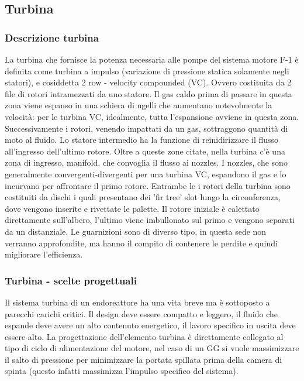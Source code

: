 \subsection{Turbina}
\subsubsection{Descrizione turbina}

La turbina che fornisce la potenza necessaria alle pompe del sistema motore F-1 è definita come turbina a impulso (variazione di pressione statica solamente negli statori), e cosiddetta 2 row - velocity compounded (VC). Ovvero costituita da 2 file di rotori intramezzati da uno statore. Il gas caldo prima di passare in questa zona viene espanso in una schiera di ugelli che aumentano notevolmente la velocità: per le turbina VC, idealmente, tutta l'espansione avviene in questa zona. Successivamente i rotori, venendo impattati da un gas, sottraggono quantità di moto al fluido. Lo statore intermedio ha la funzione di reinidirizzare il flusso all'ingresso dell'ultimo rotore. Oltre a queste zone citate, nella turbina c'è una zona di ingresso, manifold, che convoglia il flusso ai nozzles. I nozzles, che sono generalmente convergenti-divergenti per una turbina VC, espandono il gas e lo incurvano per affrontare il primo rotore. Entrambe le i rotori della turbina sono costituiti da dischi i quali presentano dei 'fir tree' slot lungo la circonferenza, dove vengono inserite e rivettate le palette. Il rotore iniziale è calettato direttamente sull'albero, l'ultimo viene imbullonato sul primo e vengono separati da un distanziale. Le guarnizioni sono di diverso tipo, in questa sede non verranno approfondite, ma hanno il compito di contenere le perdite e quindi migliorare l'efficienza. 

\subsubsection{Turbina - scelte progettuali}

Il sistema turbina di un endoreattore ha una vita breve ma è sottoposto a parecchi carichi critici. Il design deve essere compatto e leggero, il fluido che espande deve avere un alto contenuto energetico, il lavoro specifico in uscita deve essere alto. La progettazione dell'elemento turbina è direttamente collegato al tipo di ciclo di alimentazione del motore, nel caso di un GG si vuole massimizzare il salto di pressione per minimizzare la portata spillata prima della camera di spinta (questo infatti massimizza l'impulso specifico del sistema). 

